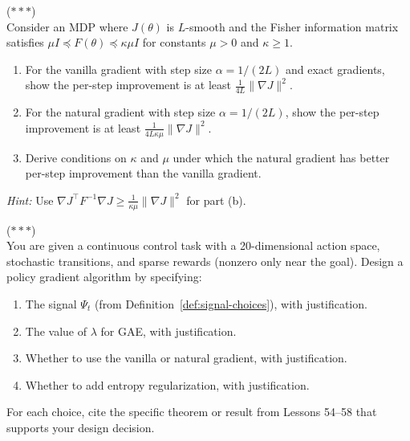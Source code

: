 \documentclass[11pt,a4paper]{article}
\begin{document}
\begin{exercise}
\textnormal{(\(***\))} \\
  Consider an MDP where $J(\theta)$ is $L$-smooth and the Fisher
  information matrix satisfies $\mu I \preceq F(\theta) \preceq
  \kappa \mu I$ for constants $\mu > 0$ and $\kappa \geq 1$.
  \begin{enumerate}[label=(\alph*)]
    \item For the vanilla gradient with step size
      $\alpha = 1/(2L)$ and exact gradients, show the per-step
      improvement is at least $\frac{1}{4L} \|\nabla J\|^2$.
    \item For the natural gradient with step size
      $\alpha = 1/(2L)$, show the per-step improvement is at least
      $\frac{1}{4L\kappa\mu} \|\nabla J\|^2$.
    \item Derive conditions on $\kappa$ and $\mu$ under which the
      natural gradient has better per-step improvement than the vanilla
      gradient.
  \end{enumerate}

  \textit{Hint:} Use $\nabla J^\top F^{-1} \nabla J \geq
  \frac{1}{\kappa\mu} \|\nabla J\|^2$ for part (b).
\end{exercise}

\begin{exercise}
\textnormal{(\(***\))} \\
  You are given a continuous control task with a 20-dimensional
  action space, stochastic transitions, and sparse rewards (nonzero
  only near the goal). Design a policy gradient algorithm by
  specifying:
  \begin{enumerate}[label=(\alph*)]
    \item The signal $\Psi_t$ (from Definition~\ref{def:signal-choices}),
      with justification.
    \item The value of $\lambda$ for GAE, with justification.
    \item Whether to use the vanilla or natural gradient, with
      justification.
    \item Whether to add entropy regularization, with justification.
  \end{enumerate}
  For each choice, cite the specific theorem or result from
  Lessons 54--58 that supports your design decision.
\end{exercise}

\end{document}
